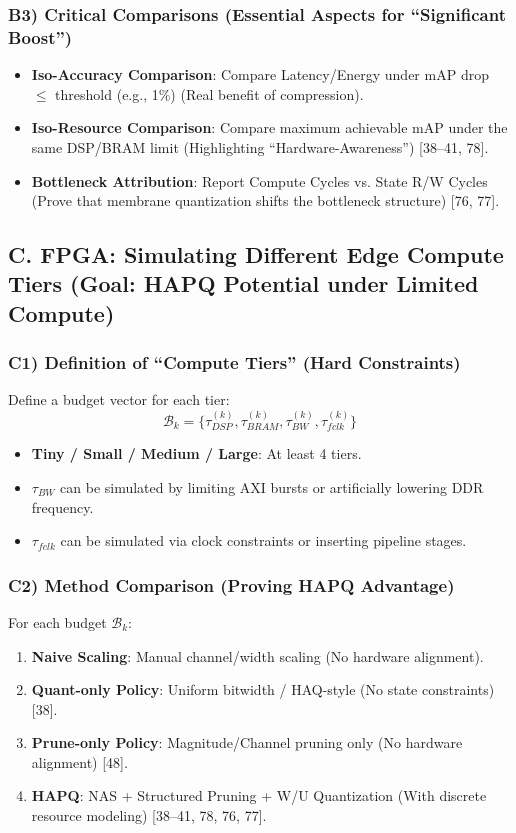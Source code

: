 \documentclass[10pt,a4paper]{article}
\begin{document}
\subsubsection{B3) Critical Comparisons (Essential Aspects for ``Significant Boost'')}
\begin{itemize}
    \item \textbf{Iso-Accuracy Comparison}: Compare Latency/Energy under mAP drop $\le$ threshold (e.g., 1\%) (Real benefit of compression).
    \item \textbf{Iso-Resource Comparison}: Compare maximum achievable mAP under the same DSP/BRAM limit (Highlighting ``Hardware-Awareness'') [38--41, 78].
    \item \textbf{Bottleneck Attribution}: Report Compute Cycles vs. State R/W Cycles (Prove that membrane quantization shifts the bottleneck structure) [76, 77].
\end{itemize}

\subsection{C. FPGA: Simulating Different Edge Compute Tiers (Goal: HAPQ Potential under Limited Compute)}

\subsubsection{C1) Definition of ``Compute Tiers'' (Hard Constraints)}
Define a budget vector for each tier:
\begin{equation}
    \mathcal{B}_k = \{ \tau^{(k)}_{DSP}, \tau^{(k)}_{BRAM}, \tau^{(k)}_{BW}, \tau^{(k)}_{fclk} \}
\end{equation}
\begin{itemize}
    \item \textbf{Tiny / Small / Medium / Large}: At least 4 tiers.
    \item $\tau_{BW}$ can be simulated by limiting AXI bursts or artificially lowering DDR frequency.
    \item $\tau_{fclk}$ can be simulated via clock constraints or inserting pipeline stages.
\end{itemize}

\subsubsection{C2) Method Comparison (Proving HAPQ Advantage)}
For each budget $\mathcal{B}_k$:
\begin{enumerate}
    \item \textbf{Naive Scaling}: Manual channel/width scaling (No hardware alignment).
    \item \textbf{Quant-only Policy}: Uniform bitwidth / HAQ-style (No state constraints) [38].
    \item \textbf{Prune-only Policy}: Magnitude/Channel pruning only (No hardware alignment) [48].
    \item \textbf{HAPQ}: NAS + Structured Pruning + W/U Quantization (With discrete resource modeling) [38--41, 78, 76, 77].
\end{enumerate}
\end{document}
